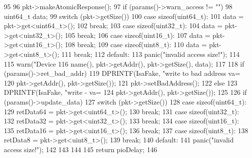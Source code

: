 \begin{DoxyCode}
95 {
96     pkt->makeAtomicResponse();
97     if (params()->warn_access != "") {
98         uint64_t data;
99         switch (pkt->getSize()) {
100           case sizeof(uint64_t):
101             data = pkt->get<uint64_t>();
102             break;
103           case sizeof(uint32_t):
104             data = pkt->get<uint32_t>();
105             break;
106           case sizeof(uint16_t):
107             data = pkt->get<uint16_t>();
108             break;
109           case sizeof(uint8_t):
110             data = pkt->get<uint8_t>();
111             break;
112           default:
113             panic("invalid access size!\n");
114         }
115         warn("Device %
116                 name(), pkt->getAddr(), pkt->getSize(), data);
117     }
118     if (params()->ret_bad_addr) {
119         DPRINTF(IsaFake, "write to bad address va=%
120                 pkt->getAddr(), pkt->getSize());
121         pkt->setBadAddress();
122     } else {
123         DPRINTF(IsaFake, "write - va=%
124                 pkt->getAddr(), pkt->getSize());
125 
126         if (params()->update_data) {
127             switch (pkt->getSize()) {
128               case sizeof(uint64_t):
129                 retData64 = pkt->get<uint64_t>();
130                 break;
131               case sizeof(uint32_t):
132                 retData32 = pkt->get<uint32_t>();
133                 break;
134               case sizeof(uint16_t):
135                 retData16 = pkt->get<uint16_t>();
136                 break;
137               case sizeof(uint8_t):
138                 retData8 = pkt->get<uint8_t>();
139                 break;
140               default:
141                 panic("invalid access size!\n");
142             }
143         }
144     }
145     return pioDelay;
146 }
\end{DoxyCode}


